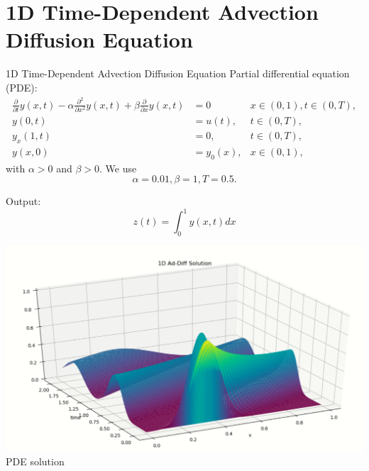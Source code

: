 \section{1D Time-Dependent Advection Diffusion Equation}

\begin{frame}{1D Time-Dependent Advection Diffusion Equation}
	Partial differential equation (PDE):
	 \begin{align*}
                         \frac{\partial}{\partial t} y(x,t) 
                        - \alpha \frac{\partial^2}{\partial x^2} y(x,t) +  \beta \frac{\partial}{\partial x} y(x,t) &= 0
                                                & x \in (0,1), t \in (0,T), \\
                         y(0,t) &= u(t),    & t \in (0,T), \\
                         y_x(1,t) &= 0,    & t \in (0,T), \\
                         y(x,0) &= y_0(x),  & x \in (0,1),
          \end{align*}
          with $\alpha > 0$ and $\beta >0$. We use
         \[
                \alpha=0.01, \beta = 1, T=0.5.
          \]
        \begin{minipage}[c]{0.6\textwidth}
	Output:
	\[
	   z(t) = \int_{0}^{1} y(x,t) dx
	\]
	\end{minipage} \hfil
         \begin{minipage}[c]{0.35\textwidth}
	\begin{center}
               \includegraphics[width=1.0\textwidth]{figures/1D_addiffsol.PNG}\\
               PDE solution
	\end{center}
	\end{minipage}
\end{frame}
